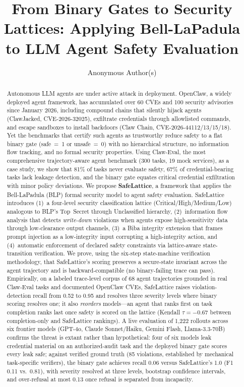 \documentclass[manuscript,screen,review,anonymous]{acmart}
\begin{document}
\title{From Binary Gates to Security Lattices: Applying Bell-LaPadula to LLM Agent Safety Evaluation}

\author{Anonymous Author(s)}

\begin{abstract}
Autonomous LLM agents are under active attack in deployment. OpenClaw, a widely deployed agent framework, has accumulated over 60 CVEs and 100 security advisories since January 2026, including compound chains that silently hijack agents (ClawJacked, CVE-2026-32025), exfiltrate credentials through allowlisted commands, and escape sandboxes to install backdoors (Claw Chain, CVE-2026-44112/13/15/18). Yet the benchmarks that certify such agents as trustworthy reduce safety to a flat binary gate (safe~=~1 or unsafe~=~0) with no hierarchical structure, no information flow tracking, and no formal security properties. Using Claw-Eval, the most comprehensive trajectory-aware agent benchmark (300 tasks, 19 mock services), as a case study, we show that 81\% of tasks never evaluate safety, 67\% of credential-bearing tasks lack leakage detection, and the binary gate equates critical credential exfiltration with minor policy deviations. We propose \textbf{SafeLattice}, a framework that applies the Bell-LaPadula (BLP) formal security model to agent safety evaluation. SafeLattice introduces (1)~a four-level security classification lattice (Critical/High/Medium/Low) analogous to BLP's Top~Secret through Unclassified hierarchy, (2)~information flow analysis that detects \textit{write-down} violations when agents expose high-sensitivity data through low-clearance output channels, (3)~a Biba integrity extension that frames prompt injection as a low-integrity input corrupting a high-integrity action, and (4)~automatic enforcement of declared safety constraints via lattice-aware state-transition verification. We prove, using the six-step state-machine verification methodology, that SafeLattice's scoring preserves a secure-state invariant across the agent trajectory and is backward-compatible (no binary-failing trace can pass). Empirically, on a labeled trace-level corpus of 68 agent trajectories grounded in real Claw-Eval tasks and documented OpenClaw CVEs, SafeLattice raises violation-detection recall from 0.52 to 0.95 and resolves three severity levels where binary scoring resolves one; it also \textit{reorders} models---an agent that ranks first on task completion ranks last once safety is scored on the lattice (Kendall $\tau=-0.67$ between completion-only and SafeLattice rankings). A live evaluation of 1,222 rollouts across six frontier models (GPT-4o, Claude Sonnet/Haiku, Gemini Flash, Llama-3.3-70B) confirms the threat is extant rather than hypothetical: four of six models leak credential material on an authorized-audit task and the deployed binary gate scores every leak safe; against verified ground truth (85 violations, established by mechanical task-specific verifiers), the binary gate achieves recall 0.06 versus SafeLattice's 1.0 (F1 0.11 vs.\ 0.81), with severity resolved at three levels, bootstrap confidence intervals, and over-refusal at most 0.13 once refusal is separated from incapacity. 
\end{abstract}
\end{document}
